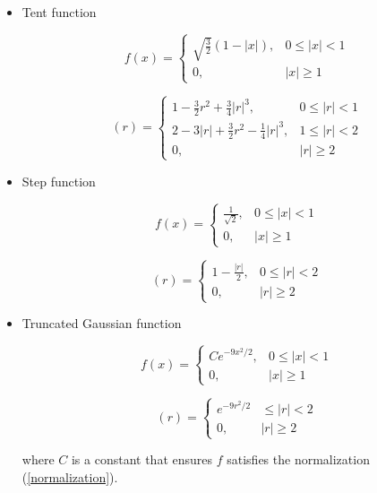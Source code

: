 \begin{itemize}
\item Tent function

\begin{equation}\label{ftent}
f(x) =
\begin{cases}
\sqrt{\frac{3}{2}}(1-|x|), & 0 \leq |x| < 1 \\
0, & |x| \geq 1
\end{cases}
\end{equation}

\begin{equation}
[f*f](r) = 
\begin{cases}
1-\frac{3}{2}r^2+\frac{3}{4}|r|^3, & 0 \leq |r| < 1 \\
2-3|r|+\frac{3}{2}r^2-\frac{1}{4}|r|^3, & 1 \leq |r| <2 \\
0, & |r|\geq 2
\end{cases}
\end{equation}

\item Step function

\begin{equation}\label{fstep}
f(x) =
\begin{cases}
\frac{1}{\sqrt{2}}, & 0 \leq |x| < 1 \\
0, & |x| \geq 1
\end{cases}
\end{equation}

\begin{equation}
[f*f](r) = 
\begin{cases}
1-\frac{|r|}{2}, & 0 \leq |r| < 2 \\
0, & |r|\geq 2
\end{cases}
\end{equation}

\item Truncated Gaussian function

\begin{equation}\label{fgaussian}
f(x) =
\begin{cases}
Ce^{-9x^2/2}, & 0 \leq |x| < 1 \\
0, & |x| \geq 1
\end{cases}
\end{equation}

\begin{equation}
[f*f](r) = 
\begin{cases}
e^{-9r^2/2} & \leq |r| < 2 \\
0, & |r|\geq 2
\end{cases}
\end{equation}

\noindent where $C$ is a constant that ensures $f$ satisfies the normalization (\ref{normalization}).

\end{itemize}



